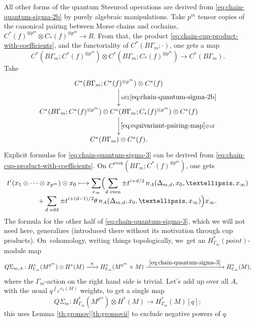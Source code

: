 \documentclass[10pt,a4paper]{amsart}
\newcommand\mto{\mathchoice{\longmapsto}{\mapsto}{\mapsto}{\mapsto}}
\newcommand\To[1]{\mathchoice{\xrightarrow{\textstyle\kern4pt#1\kern3pt}}{\stackrel{#1}{\longrightarrow}}{}{}}
\theoremstyle{plain}
\theoremstyle{definition}
\begin{document}
All other forms of the quantum Steenrod operations are derived from \eqref{eq:chain-quantum-sigma-2b} by purely algebraic manipulations. Take $p^m$ tensor copies of the canonical pairing between Morse chains and cochains, $C^*(f)^{\otimes p^m} \otimes C_*(f)^{\otimes p^m} \to R$. From that, the product \eqref{eq:chain-cup-product-with-coefficients}, and the functoriality of $C^*(B\Gamma_m;\cdot)$, one gets a map
\begin{equation}\label{eq:equivariant-pairing-map}
C^*(B\Gamma_m; C^*(f)^{\otimes p^m}) \otimes C^*(B\Gamma_m; C_*(f)^{\otimes p^m}) \to C^*(B\Gamma_m).
\end{equation}
Take
\begin{equation}\label{eq:chain-quantum-sigma-3}
\begin{array}{c}
\xymatrix{
C^*(B\Gamma_m; C^*(f)^{\otimes p^m}) \otimes C^*(f) \ar[d]^-{\mathit{id} \otimes \eqref{eq:chain-quantum-sigma-2b}}
\\
C^*(B\Gamma_m; C^*(f)^{\otimes p^m}) \otimes
C^*(B\Gamma_m; C_*(f)^{\otimes p^m}) \otimes C^*(f) \ar[d]^-{\eqref{eq:equivariant-pairing-map} \otimes \mathit{id}} \\
C^*(B\Gamma_m) \otimes C^*(f).
}
\end{array}
\end{equation}
Explicit formulas for \eqref{eq:chain-quantum-sigma-3} can be derived from \eqref{eq:chain-cup-product-with-coefficients}. On $C^{\mathrm{even}}(B\Gamma_m;C^*(f)^{\otimes p^m})$, one gets\vspace*{-5pt}
\begin{multline*}
t^i(x_1 \otimes \cdots \otimes x_{p^m}) \otimes x_0 \mto \sum_{x_\infty}
\Bigl(
\sum_{d \text{ even}} \pm t^{i+d/2} \, n_A(\Delta_{m,d}, x_0,\dots,x_\infty)
\\[-3pt]
+
\sum_{d \text{ odd}} \pm t^{i+(d-1)/2}\theta \, n_A(\Delta_{m,d}, x_0,\dots,x_{\infty})
\Bigr) x_\infty.
\end{multline*}
The formula for the other half of \eqref{eq:chain-quantum-sigma-3}, which we will not need here, generalizes \cite[Eq.\,(4.15)]{seidel-wilkins21} (introduced there without its motivation through cup products). On~\hbox{cohomology}, writing things topologically, we~get an $H^*_{\Gamma_m}(\mathit{point})$-module map
\begin{equation*}
Q\Sigma_{m,A}: H^*_{\Gamma_m}(M^{p^m}) \otimes H^*(M)
\To{\times} H^*_{\Gamma_m}(M^{p^m} \times M)
\To{\eqref{eq:chain-quantum-sigma-3}} H^*_{\Gamma_m}(M),
\end{equation*}
where the $\Gamma_m$-action on the right hand side is trivial. Let's add up over all $A$, with the usual $q^{\int_A c_1(M)}$ weights, to get a single map
\begin{equation}\label{eq:quantum-m}
Q\Sigma_m: H^*_{\Gamma_m}(M^{p^m}) \otimes H^*(M)
\to H^*_{\Gamma_m}(M)[q];
\end{equation}
this uses Lemma \ref{th:gromov}\eqref{th:gromovii} to exclude negative powers of $q$.
\end{document}

